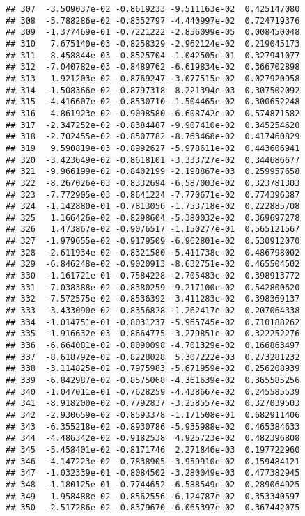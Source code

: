 \documentclass[
]{article}
\begin{document}
\begin{verbatim}
## 307  -3.509037e-02 -0.8619233 -9.511163e-02  0.425147080
## 308  -5.788286e-02 -0.8352797 -4.440997e-02  0.724719376
## 309  -1.377469e-01 -0.7221222 -2.856099e-05  0.008450048
## 310   7.675140e-03 -0.8258329 -2.962124e-02  0.219045173
## 311  -8.458844e-03 -0.8525704 -1.042505e-01  0.327941077
## 312  -7.040782e-03 -0.8489762 -6.619834e-02  0.366702898
## 313   1.921203e-02 -0.8769247 -3.077515e-02 -0.027920958
## 314  -1.508366e-02 -0.8797318  8.221394e-03  0.307502092
## 315  -4.416607e-02 -0.8530710 -1.504465e-02  0.300652248
## 316   4.861923e-02 -0.9098580 -6.608742e-02  0.574871582
## 317  -2.347252e-02 -0.8384487 -9.907410e-02  0.345254620
## 318  -2.702455e-02 -0.8507782 -8.763468e-02  0.417460829
## 319   9.590819e-03 -0.8992627 -5.978611e-02  0.443606941
## 320  -3.423649e-02 -0.8618101 -3.333727e-02  0.344686677
## 321  -9.966199e-02 -0.8402199 -2.198867e-03  0.259957658
## 322  -8.267026e-03 -0.8332694 -6.587003e-02  0.323781303
## 323  -7.772905e-03 -0.8641224 -7.770671e-02  0.774396387
## 324  -1.142880e-01 -0.7813056 -1.753718e-02  0.222885708
## 325   1.166426e-02 -0.8298604 -5.380032e-02  0.369697278
## 326   1.473867e-02 -0.9076517 -1.150277e-01  0.565121567
## 327  -1.979655e-02 -0.9179509 -6.962801e-02  0.530912070
## 328  -2.611934e-02 -0.8321580 -5.411738e-02  0.486798002
## 329  -6.846248e-02 -0.9020913 -8.632751e-02  0.465504502
## 330  -1.161721e-01 -0.7584228 -2.705483e-02  0.398913772
## 331  -7.038388e-02 -0.8380259 -9.217100e-02  0.542800620
## 332  -7.572575e-02 -0.8536392 -3.411283e-02  0.398369137
## 333  -3.433090e-02 -0.8356828 -1.262417e-02  0.207064338
## 334  -1.014751e-01 -0.8031237 -5.965745e-02  0.710188262
## 335  -1.916632e-03 -0.8664775 -3.279851e-02  0.322252276
## 336  -6.664081e-02 -0.8090098 -4.701329e-02  0.166863497
## 337  -8.618792e-02 -0.8228028  5.307222e-03  0.273281232
## 338  -3.114825e-02 -0.7975983 -5.671959e-02  0.256208939
## 339  -6.842987e-02 -0.8575068 -4.361639e-02  0.365585256
## 340  -1.047011e-01 -0.7628259 -4.438667e-02  0.245585539
## 341  -8.918200e-02 -0.7792837 -3.258557e-02  0.327039503
## 342  -2.930659e-02 -0.8593378 -1.171508e-01  0.682911406
## 343  -6.355218e-02 -0.8930786 -5.935988e-02  0.465384633
## 344  -4.486342e-02 -0.9182538  4.925723e-02  0.482396808
## 345  -5.458401e-02 -0.8171746  2.271846e-03  0.197722960
## 346  -4.147223e-02 -0.7838905 -3.959910e-02  0.159484121
## 347  -1.032339e-01 -0.8084502 -3.280049e-03  0.477382945
## 348  -1.180125e-01 -0.7744652 -6.588549e-02  0.289064925
## 349   1.958488e-02 -0.8562556 -6.124787e-02  0.353340597
## 350  -2.517286e-02 -0.8379670 -6.065397e-02  0.367442075

\end{verbatim}
\end{document}

